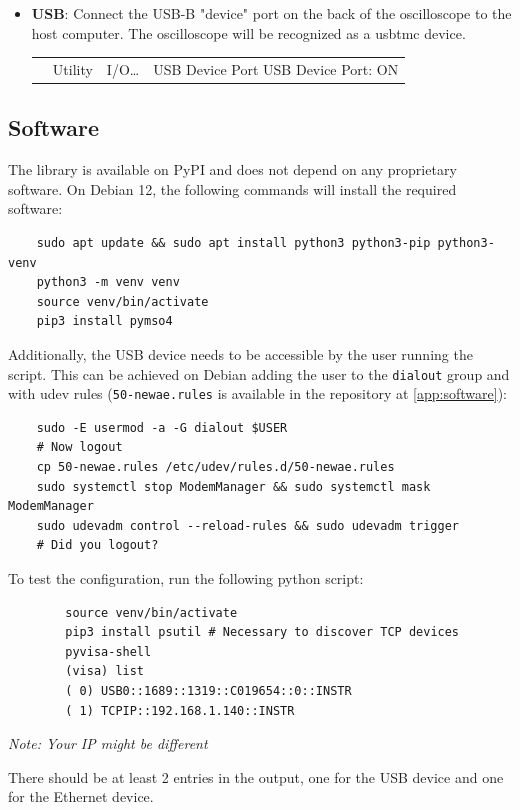 \documentclass[a4paper,english,twoside,10pt]{article}
\newenvironment{scopesetting}{
	\parskip=5pt\par\nopagebreak\centering\sffamily%
	\begin{tabular}{>{\columncolor{cyan!15}}m{2em} >{\columncolor{cyan!15}}m{.8\textwidth}}
	 & 
} {
	\\
	\end{tabular}
	\par\noindent\ignorespacesafterend%
}
\begin{document}
\begin{itemize}
	\item \textbf{USB}: Connect the USB-B "device" port on the back of the oscilloscope to the host computer. The oscilloscope will be recognized as a \gls{usbtmc} device.
	\begin{scopesetting}
		Utility\ \rightarrow\  I/O\ldots\ \rightarrow\  USB Device Port\newline
		USB Device Port: ON
	\end{scopesetting}
\end{itemize}

\subsection{Software}
The library is available on PyPI and does not depend on any proprietary software. On Debian 12, the following commands will install the required software:
\begin{verbatim}
	sudo apt update && sudo apt install python3 python3-pip python3-venv
	python3 -m venv venv
	source venv/bin/activate
	pip3 install pymso4
\end{verbatim}
Additionally, the USB device needs to be accessible by the user running the script. This can be achieved on Debian adding the user to the \texttt{dialout} group and with udev rules (\texttt{50-newae.rules} is available in the repository at \autoref{app:software}):
\begin{verbatim}
	sudo -E usermod -a -G dialout $USER
	# Now logout
	cp 50-newae.rules /etc/udev/rules.d/50-newae.rules
	sudo systemctl stop ModemManager && sudo systemctl mask ModemManager
	sudo udevadm control --reload-rules && sudo udevadm trigger
	# Did you logout?
\end{verbatim}
To test the configuration, run the following python script:
\begin{flushleft}
	\captionsetup{type=listing}
	\begin{verbatim}
		source venv/bin/activate
		pip3 install psutil # Necessary to discover TCP devices
		pyvisa-shell
		(visa) list
		( 0) USB0::1689::1319::C019654::0::INSTR
		( 1) TCPIP::192.168.1.140::INSTR
	\end{verbatim}
	\caption{\textit{Note: Your IP might be different}}
\end{flushleft}
There should be at least 2 entries in the output, one for the USB device and one for the Ethernet device.
\end{document}
